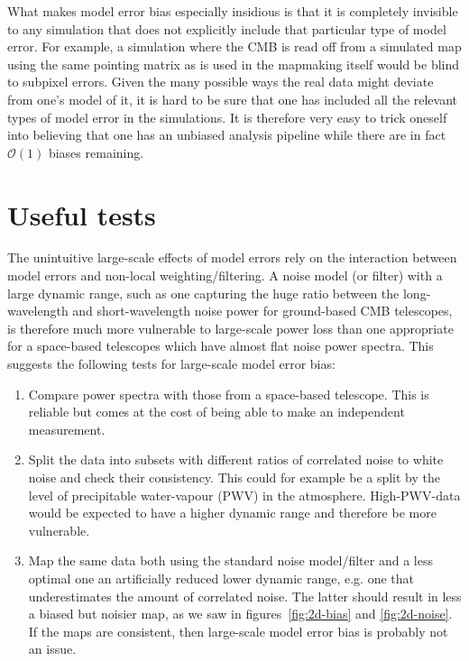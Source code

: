\documentclass[twocolumn,apj]{aastex63}
\begin{document}
What makes model error bias especially insidious is that
it is completely invisible to any simulation that does not explicitly include
that particular type of model error. For example, a simulation where the CMB
is read off from a simulated map using the same pointing matrix as is used
in the mapmaking itself would be blind to subpixel errors. Given the many
possible ways the real data might deviate from one's model of it, it is hard
to be sure that one has included all the relevant types of model error in the simulations.
It is therefore very easy to trick oneself into believing that one has an
unbiased analysis pipeline while there are in fact $\mathcal{O}(1)$ biases remaining.

\section{Useful tests}
The unintuitive large-scale effects of model errors rely on the interaction
between model errors and non-local weighting/filtering. A noise model (or filter) with
a large dynamic range, such as one capturing the huge ratio between the long-wavelength
and short-wavelength noise power for ground-based CMB telescopes, is therefore
much more vulnerable to large-scale power loss than one appropriate for a
space-based telescopes which have almost flat noise power spectra. This suggests
the following tests for large-scale model error bias:
\begin{enumerate}
	\item Compare power spectra with those from a space-based telescope.
		This is reliable but comes at the cost of being able to make an independent measurement.
	\item Split the data into subsets with different ratios of correlated noise to white noise
		and check their consistency. This could for example be a split by the
		level of precipitable water-vapour (PWV) in the atmosphere. High-PWV-data
		would be expected to have a higher dynamic range and therefore be more vulnerable.
	\item Map the same data both using the standard noise model/filter and a
		less optimal one an artificially reduced lower dynamic range, e.g. one that
		underestimates the amount of correlated noise. The latter should result in
		less a biased but noisier map, as we saw in figures~\ref{fig:2d-bias} and \ref{fig:2d-noise}.
		If the maps are consistent, then large-scale model error bias is probably not an issue.
\end{enumerate}
\end{document}
